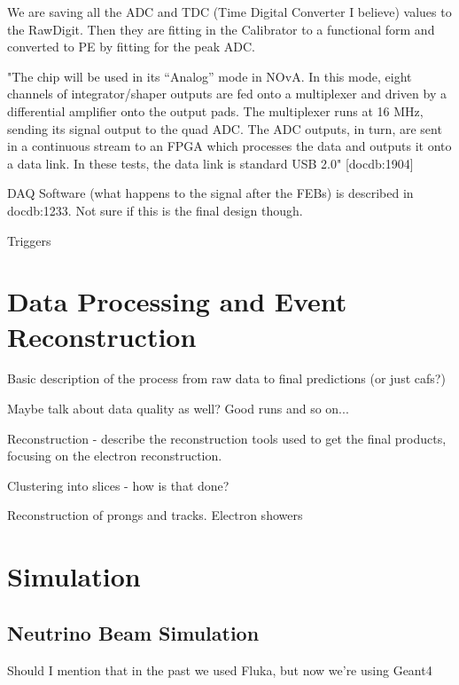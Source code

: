 We are saving all the ADC and TDC (Time Digital Converter I believe) values to the RawDigit. Then they are fitting in the Calibrator to a functional form and converted to PE by fitting for the peak ADC.

"The chip will be used in its “Analog” mode in NOvA. In this mode, eight channels of integrator/shaper outputs are fed onto a multiplexer and driven by a differential amplifier onto the output pads. The multiplexer runs at 16 MHz, sending its signal output to the quad ADC. The ADC outputs, in turn, are sent in a continuous stream to an FPGA which processes the data and outputs it onto a data link. In these tests, the data link is standard USB 2.0" [docdb:1904]

DAQ Software (what happens to the signal after the FEBs) is described in docdb:1233. Not sure if this is the final design though. 

Triggers


\section{Data Processing and Event Reconstruction}
Basic description of the process from raw data to final predictions (or just cafs?)

Maybe talk about data quality as well? Good runs and so on...

Reconstruction - describe the reconstruction tools used to get the final products, focusing on the electron reconstruction.

Clustering into slices - how is that done?

Reconstruction of prongs and tracks. Electron showers

\section{Simulation}

\subsection{Neutrino Beam Simulation}
Should I mention that in the past we used Fluka, but now we're using Geant4

